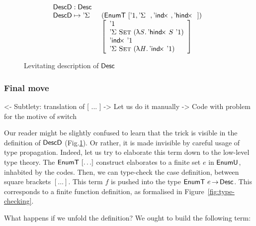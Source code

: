\begin{figure}

\[\stk{
\DescD : \Desc \\
\begin{array}{@{}ll}
\DescD \mapsto \DSigma{}{} & (\EnumT [ \DUnit, \DSigma{}{}, \DIndx{}, \DHindx{}{} ]) \\
                           & \left[\begin{array}{l}
                                   \DUnit                                            \\
                                   \DSigma{\Set}{(\LAM{\V{S}} \DHindx{S}{\DUnit})}   \\
                                   \DIndx{\DUnit}                                    \\
                                   \DSigma{\Set}{(\LAM{\V{H}} \DIndx{\DUnit})}
                                   \end{array}
                             \right]
\end{array}
}\]

\caption{Levitating description of $\Desc$}
\label{fig:desc-levitate}

\end{figure}

\subsubsection{Final move}

\begin{wstructure}
<- Subtlety: translation of [ ... ]
    -> Let us do it manually
        -> Code with problem for the motive of switch
\end{wstructure}

Our reader might be slightly confused to learn that the trick is
visible in the definition of $\DescD$
(Fig.\ref{fig:desc-levitate}). Or rather, it is made invisible by
careful usage of type propagation. Indeed, let us try to elaborate
this term down to the low-level type theory. The $\EnumT [ \ldots ]$
construct elaborates to a finite set $e$ in $\EnumU$, inhabited by the
codes. Then, we can type-check the case definition, between square
brackets $[ \ldots ]$. This term $f$ is pushed into the type
$\EnumT{e} \To \Desc$. This corresponds to a finite function
definition, as formalised in Figure~\ref{fig:type-checking}.

What happens if we unfold the definition? We ought to build the following term:

